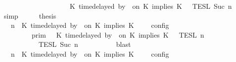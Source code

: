 \begin{isabellebody}
\ \ \ \ \ \ \ \ \ \ \ \ \ \ \ \ \ \ {\isasyminter}\ {\isasymlbrakk}{\isasymlbrakk}\ {\isacharparenleft}K\ time{\isacharminus}delayed\ by\ {\isasymdelta}{\isasymtau}\ on\ K\ implies\ K\ {\isacharhash}\ {\isasymPhi}\ {\isasymrbrakk}{\isasymrbrakk}\isactrlsub T\isactrlsub E\isactrlsub S\isactrlsub L\isactrlbsup {\isasymge}\ Suc\ n\isactrlesup {\isacartoucheclose}\isanewline
\ \ \ \ \isamarkupfalse%
\ simp\isanewline
\ \ \isamarkupfalse%
\ \isamarkupfalse%
\ {\isacharquery}thesis\isanewline
\ \ \isamarkupfalse%
\ {\isacharminus}\isanewline
\ \ \ \ \isamarkupfalse%
\ {\isacartoucheopen}{\isasymlbrakk}\ {\isasymGamma}{\isacharcomma}\ n\ {\isasymturnstile}\ {\isacharparenleft}K\ time{\isacharminus}delayed\ by\ {\isasymdelta}{\isasymtau}\ on\ K\ implies\ K\ {\isacharhash}\ {\isasymPsi}\ {\isasymtriangleright}\ {\isasymPhi}\ {\isasymrbrakk}\isactrlsub c\isactrlsub o\isactrlsub n\isactrlsub f\isactrlsub i\isactrlsub g\isanewline
\ \ \ \ \ \ {\isacharequal}\ {\isasymlbrakk}{\isasymlbrakk}\ {\isasymGamma}\ {\isasymrbrakk}{\isasymrbrakk}\isactrlsub p\isactrlsub r\isactrlsub i\isactrlsub m\ {\isasyminter}\ {\isacharparenleft}{\isasymlbrakk}{\isasymlbrakk}\ {\isacharparenleft}K\ time{\isacharminus}delayed\ by\ {\isasymdelta}{\isasymtau}\ on\ K\ implies\ K\ {\isacharhash}\ {\isasymPsi}\ {\isasymrbrakk}{\isasymrbrakk}\isactrlsub T\isactrlsub E\isactrlsub S\isactrlsub L\isactrlbsup {\isasymge}\ n\isactrlesup \isanewline
\ \ \ \ \ \ \ \ {\isasyminter}\ {\isasymlbrakk}{\isasymlbrakk}\ {\isasymPhi}\ {\isasymrbrakk}{\isasymrbrakk}\isactrlsub T\isactrlsub E\isactrlsub S\isactrlsub L\isactrlbsup {\isasymge}\ Suc\ n\isactrlesup {\isacharparenright}{\isacartoucheclose}\isanewline
\ \ \ \ \ \ \isamarkupfalse%
\ {}\ \isamarkupfalse%
\ blast\isanewline
\ \ \ \ \isamarkupfalse%
\ {\isacartoucheopen}{\isasymlbrakk}\ {\isasymGamma}{\isacharcomma}\ n\ {\isasymturnstile}\ {\isacharparenleft}K\ time{\isacharminus}delayed\ by\ {\isasymdelta}{\isasymtau}\ on\ K\ implies\ K\ {\isacharhash}\ {\isasymPsi}\ {\isasymtriangleright}\ {\isasymPhi}\ {\isasymrbrakk}\isactrlsub c\isactrlsub o\isactrlsub n\isactrlsub f\isactrlsub i\isactrlsub g\isanewline

\end{isabellebody}
